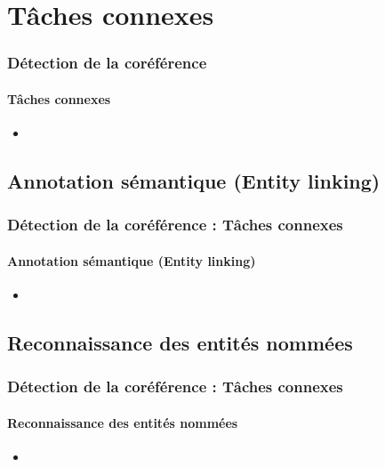 \documentclass[xcolor=table]{beamer}
\begin{document}
\section{Tâches connexes}

\begin{frame}
	\frametitle{Détection de la coréférence}
	\framesubtitle{Tâches connexes}
	
	\begin{itemize}
		\item 
	\end{itemize}
	
\end{frame}

\subsection{Annotation sémantique (Entity linking)}

\begin{frame}
	\frametitle{Détection de la coréférence : Tâches connexes}
	\framesubtitle{Annotation sémantique (Entity linking)}
	
	\begin{itemize}
		\item 
	\end{itemize}
	
\end{frame}

\subsection{Reconnaissance des entités nommées}

\begin{frame}
	\frametitle{Détection de la coréférence : Tâches connexes}
	\framesubtitle{Reconnaissance des entités nommées}
	
	\begin{itemize}
		\item 
	\end{itemize}
	
\end{frame}


\end{document}
